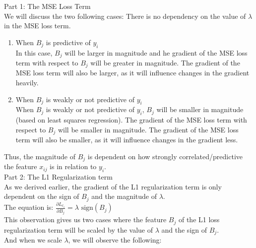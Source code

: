\documentclass[12pt]{article}
\begin{document}
\begin{enumerate}
\begin{enumerate}
Part 1: The MSE Loss Term \\ 

We will discuss the two following cases: There is no dependency on the value of $\lambda$ in the MSE loss term.
\begin{enumerate}
  \item When $B_j$ is predictive of $y_i$ \\

  In this case, $B_j$ will be larger in magnitude and he gradient of the MSE loss term with respect to $B_j$ will be greater in magnitude. The gradient of the MSE loss term will also be larger, as it will influence changes in the gradient heavily.\\


  \item When $B_j$ is weakly or not predictive of $y_i$\\
  
  When $B_j$ is weakly or not predictive of $y_i$, $B_j$ will be smaller in magnitude (based on least squares regression). The gradient of the MSE loss term with respect to $B_j$ will be smaller in magnitude. The gradient of the MSE loss term will also be smaller, as it will influence changes in the gradient less.\\
\end{enumerate}

Thus, the magnitude of $B_j$ is dependent on how strongly correlated/predictive the feature $x_{ij}$ is in relation to $y_i$.\\

Part 2: The L1 Regularization term \\ 

As we derived earlier, the gradient of the L1 regularization term is only dependent on the sign of $B_j$ and the magnitude of $\lambda$. \\ 

The equation is: $\frac{\partial L_{\ell_1}}{\partial B_j} = \lambda \text{ sign} (B_j) $\\

This observation gives us two cases where the feature $B_j$ of the L1 loss regularization term will be scaled by the value of $\lambda$ and the sign of $B_j$. \\ 

And when we scale $\lambda$, we will observe the following: \\ 

\begin{enumerate}


\end{enumerate}
\end{enumerate}
\end{enumerate}
\end{document}
